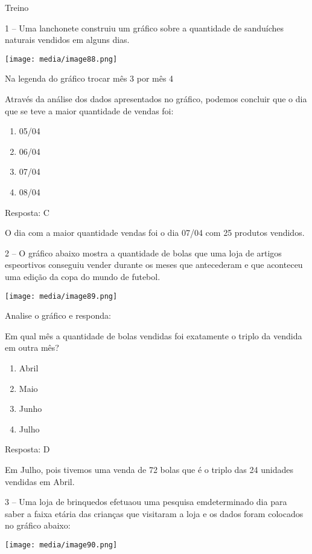 Treino

1 -- Uma lanchonete construiu um gráfico sobre a quantidade de
sanduíches naturais vendidos em alguns dias.

\texttt{[image: media/image88.png]}

Na legenda do gráfico trocar mês 3 por mês 4

Através da análise dos dados apresentados no gráfico, podemos concluir
que o dia que se teve a maior quantidade de vendas foi:

\begin{enumerate}
\def\labelenumi{\alph{enumi})}
\item
  05/04
\item
  06/04
\item
  07/04
\item
  08/04
\end{enumerate}

Resposta: C

O dia com a maior quantidade vendas foi o dia 07/04 com 25 produtos
vendidos.

2 -- O gráfico abaixo mostra a quantidade de bolas que uma loja de
artigos espeortivos conseguiu vender durante os meses que antecederam e
que aconteceu uma edição da copa do mundo de futebol.

\texttt{[image: media/image89.png]}

Analise o gráfico e responda:

Em qual mês a quantidade de bolas vendidas foi exatamente o triplo da
vendida em outra mês?

\begin{enumerate}
\def\labelenumi{\alph{enumi})}
\item
  Abril
\item
  Maio
\item
  Junho
\item
  Julho
\end{enumerate}

Resposta: D

Em Julho, pois tivemos uma venda de 72 bolas que é o triplo das 24
unidades vendidas em Abril.

3 -- Uma loja de brinquedos efetuaou uma pesquisa emdeterminado dia para
saber a faixa etária das crianças que visitaram a loja e os dados foram
colocados no gráfico abaixo:

\texttt{[image: media/image90.png]}

